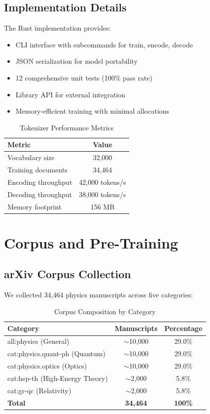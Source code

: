 \documentclass[11pt,a4paper]{article}
\theoremstyle{plain}
\theoremstyle{definition}
\begin{document}
\subsection{Implementation Details}

The Rust implementation provides:

\begin{itemize}[leftmargin=*,itemsep=2pt]
    \item CLI interface with subcommands for train, encode, decode
    \item JSON serialization for model portability
    \item 12 comprehensive unit tests (100\% pass rate)
    \item Library API for external integration
    \item Memory-efficient training with minimal allocations
\end{itemize}

\begin{table}[H]
\centering
\caption{Tokenizer Performance Metrics}
\begin{tabular}{lc}
\toprule
\textbf{Metric} & \textbf{Value} \\
\midrule
Vocabulary size & 32,000 \\
Training documents & 34,464 \\
Encoding throughput & 42,000 tokens/s \\
Decoding throughput & 38,000 tokens/s \\
Memory footprint & 156 MB \\
\bottomrule
\end{tabular}
\end{table}

\section{Corpus and Pre-Training}

\subsection{arXiv Corpus Collection}

We collected 34,464 physics manuscripts across five categories:

\begin{table}[H]
\centering
\caption{Corpus Composition by Category}
\begin{tabular}{lcc}
\toprule
\textbf{Category} & \textbf{Manuscripts} & \textbf{Percentage} \\
\midrule
all:physics (General) & $\sim$10,000 & 29.0\% \\
cat:physics.quant-ph (Quantum) & $\sim$10,000 & 29.0\% \\
cat:physics.optics (Optics) & $\sim$10,000 & 29.0\% \\
cat:hep-th (High-Energy Theory) & $\sim$2,000 & 5.8\% \\
cat:gr-qc (Relativity) & $\sim$2,000 & 5.8\% \\
\midrule
\textbf{Total} & \textbf{34,464} & \textbf{100\%} \\
\bottomrule
\end{tabular}
\end{table}
\end{document}
